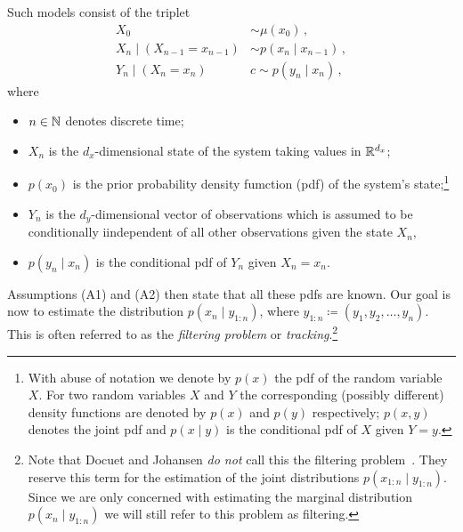 Such models consist of the triplet
\begin{align*}
  \label{eq:hmm:1}
  X_0 &\sim \mu(x_0)\,,\\
  X_n \mid (X_{n-1} = x_{n-1}) &\sim p(x_n \mid x_{n-1})\,,\\
  Y_n \mid (X_n = x_n) &c\sim p(y_n \mid x_n) \,,
\end{align*}
where
\begin{itemize}
\item $n \in \mathbb{N}$ denotes discrete time;
\item $X_n$ is the $d_x$-dimensional state of the system taking values
  in $\mathbb{R}^{d_x}$;
\item $p(x_0)$ is the prior probability density fumction (pdf) of the
  system's state;\footnote{ With abuse of notation we denote by $p(x)$
    the pdf of the random variable $X$. For two random variables $X$
    and $Y$ the corresponding (possibly different) density functions
    are denoted by $p(x)$ and $p(y)$ respectively; $p(x,y)$ denotes
    the joint pdf and $p(x \mid y)$ is the conditional pdf of $X$
    given $Y = y$.}
\item $Y_n$ is the $d_y$-dimensional vector of observations which is
  assumed to be conditionally iindependent of all other observations
  given the state $X_n$,
\item $p(y_n \mid x_n)$ is the conditional pdf of $Y_n$ given
  $X_n = x_n$.
\end{itemize}
Assumptions (A1) and (A2) then state that all these pdfs are known.
Our goal is now to estimate the distribution $p(x_n \mid y_{1:n})$,
where $y_{1:n} \coloneqq (y_1, y_2, \dotsc, y_n)$. This is often
referred to as the \emph{filtering problem} or
\emph{tracking}.\footnote{Note that Docuet and Johansen \emph{do not}
  call this the filtering problem~\cite{doucet}. They reserve this
  term for the estimation of the joint distributions
  $p(x_{1:n} \mid y_{1:n} )$. Since we are only concerned with
  estimating the marginal distribution $p(x_n \mid y_{1:n} )$ we will
  still refer to this problem as filtering.}

